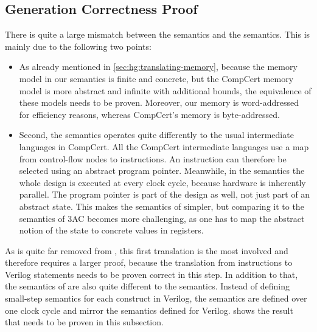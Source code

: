 \subsection{\htl{} Generation Correctness Proof}%
\label{sec:hg:htl-generation-correctness-proof}


There is quite a large mismatch between the \htl{} semantics and the
\rtlsubpar{} semantics.  This is mainly due to the following two points:

\begin{itemize}
\item As already mentioned in \cref{sec:hg:translating-memory}, because the
  memory model in our \htl{} semantics is finite and concrete, but the CompCert
  memory model is more abstract and infinite with additional bounds, the
  equivalence of these models needs to be proven.  Moreover, our memory is
  word-addressed for efficiency reasons, whereas CompCert's memory is
  byte-addressed.

\item Second, the \htl{} semantics operates quite differently to the usual
  intermediate languages in CompCert.  All the CompCert intermediate languages
  use a map from control-flow nodes to instructions.  An instruction can
  therefore be selected using an abstract program pointer. Meanwhile, in the
  \htl{} semantics the whole design is executed at every clock cycle, because
  hardware is inherently parallel. The program pointer is part of the design as
  well, not just part of an abstract state. This makes the semantics of \htl{}
  simpler, but comparing it to the semantics of 3AC becomes more challenging, as
  one has to map the abstract notion of the state to concrete values in
  registers.
\end{itemize}


As \htl{} is quite far removed from \rtlsubpar{}, this first translation is the
most involved and therefore requires a larger proof, because the translation
from \rtlsubpar{} instructions to Verilog statements needs to be proven correct
in this step.  In addition to that, the semantics of \htl{} are also quite
different to the \rtlsubpar{} semantics. Instead of defining small-step
semantics for each construct in Verilog, the semantics are defined over one
clock cycle and mirror the semantics defined for Verilog.  
shows the result that needs to be proven in this subsection.

